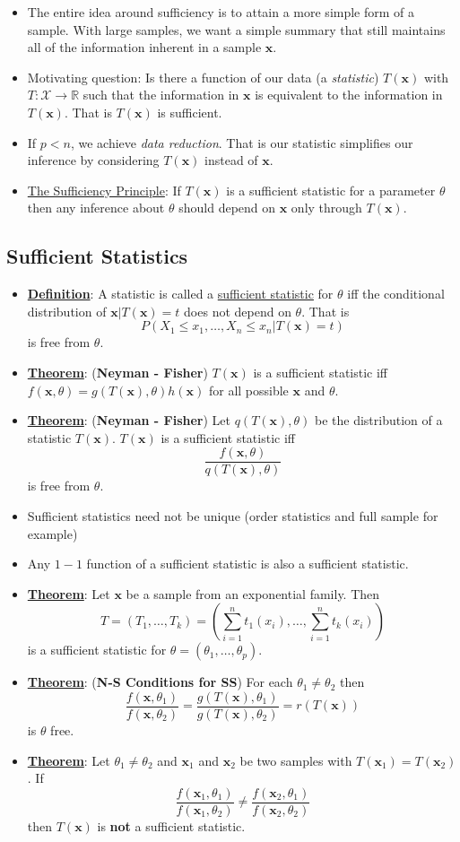 \documentclass{article}
\newcommand{\R}{{\mathbb{R}}}
\newcommand{\x}{{\textbf{x}}}
\begin{document}
\begin{itemize}
\item The entire idea around sufficiency is to attain a more simple form of a sample. With large samples, we want a simple summary that still maintains all of the information inherent in a sample $\x$. 
\item Motivating question: Is there a function of our data (a \textit{statistic}) $T(\x)$ with $T:\mathcal{X}\to\R$ such that the information in $\x$ is equivalent to the information in $T(\x)$. That is $T(\x)$ is sufficient. 
\item If $p<n$, we achieve \textit{data reduction}. That is our statistic simplifies our inference by considering $T(\x)$ instead of $\x$. 
\item \underline{The Sufficiency Principle}: If $T(\x)$ is a sufficient statistic for a parameter $\theta$ then any inference about $\theta$ should depend on $\x$ only through $T(\x)$. 
\end{itemize}

\subsection{Sufficient Statistics}

\begin{itemize}
\item \underline{\textbf{Definition}}: A statistic is called a \underline{sufficient statistic} for $\theta$ iff the conditional distribution of $\x|T(\x) = t$ does not depend on $\theta$. That is $$P(X_1\leq x_1, \ldots, X_n\leq x_n|T(\x) = t)$$ is free from $\theta$. 
\item \underline{\textbf{Theorem}}: (\textbf{Neyman - Fisher}) $T(\x)$ is a sufficient statistic iff $f(\x, \theta) = g(T(\x),\theta)h(\x)$ for all possible $\x$ and $\theta$. 
\item \underline{\textbf{Theorem}}: (\textbf{Neyman - Fisher}) Let $q(T(\x),\theta)$ be the distribution of a statistic $T(\x)$. $T(\x)$ is a sufficient statistic iff $$\frac{f(\x,\theta)}{q(T(\x),\theta)}$$ is free from $\theta$.
\item Sufficient statistics need not be unique (order statistics and full sample for example)
\item Any $1-1$ function of a sufficient statistic is also a sufficient statistic. 
\item \underline{\textbf{Theorem}}: Let $\x$ be a sample from an exponential family. Then $$T = (T_1, \ldots, T_k) = \left(\sum_{i=1}^{n}t_1(x_i),\ldots,\sum_{i=1}^{n}t_k(x_i)\right)$$ is a sufficient statistic for $\theta = (\theta_1, \ldots, \theta_p)$. 
\item \underline{\textbf{Theorem}}: (\textbf{N-S Conditions for SS}) For each $\theta_1 \neq \theta_2$ then $$\frac{f(\x, \theta_1)}{f(\x,\theta_2)} = \frac{g(T(\x),\theta_1)}{g(T(\x),\theta_2)} = r(T(\x))$$ is $\theta$ free. 
\item \underline{\textbf{Theorem}}:  Let $\theta_1 \neq \theta_2$ and $\x_1$ and $\x_2$ be two samples with $T(\x_1) = T(\x_2)$. If $$\frac{f(\x_1,\theta_1)}{f(\x_1,\theta_2)}\neq\frac{f(\x_2,\theta_1)}{f(\x_2,\theta_2)}$$ then $T(\x)$ is \textbf{not} a sufficient statistic. 
\end{itemize}
\end{document}
